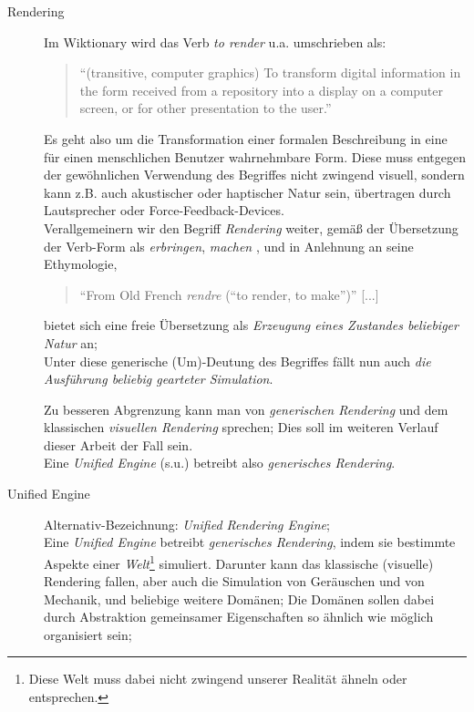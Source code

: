 \begin{description}

	\item[Rendering]
	Im Wiktionary \cite{internet:wiktionRender} wird das Verb \emph{to render} u.a. umschrieben als:
	\begin{quote}
		"`(transitive, computer graphics) To transform digital information in the form received from a repository into a 
		display on a computer screen, or for other presentation to the user."'
	\end{quote}	
	Es geht also um die Transformation einer formalen Beschreibung in eine für einen menschlichen Benutzer wahrnehmbare 
	Form. Diese muss entgegen der gewöhnlichen Verwendung des Begriffes nicht zwingend visuell, sondern kann z.B. auch 
	akustischer oder haptischer Natur sein, übertragen durch Lautsprecher oder Force-Feedback-Devices.\\
	
	Verallgemeinern wir den Begriff \emph{Rendering} weiter, gemäß der Übersetzung der Verb-Form als 
	\emph{erbringen}, \emph{machen} \cite{internet:dictCCrender},	
	und in Anlehnung an seine Ethymologie,
	\begin{quote}
		"`From Old French \emph{rendre} (“to render, to make”)"' [...] \cite{internet:wiktionRender}
	\end{quote}
	
	bietet sich eine freie Übersetzung als \emph{Erzeugung eines Zustandes beliebiger Natur} an;\\
	Unter diese generische (Um)-Deutung des Begriffes fällt nun auch \emph{die Ausführung beliebig gearteter Simulation}.
	
	Zu besseren Abgrenzung kann man von \emph{generischen Rendering} und dem klassischen 
	\emph{visuellen Rendering} sprechen; Dies soll im weiteren Verlauf dieser Arbeit der Fall sein.\\
	Eine \emph{Unified Engine} (s.u.) betreibt also \emph{generisches Rendering}.
	
	
	\item[Unified Engine] Alternativ-Bezeichnung: \emph{Unified Rendering Engine};\\
	Eine \emph{Unified Engine} betreibt \emph{generisches Rendering}, indem sie bestimmte Aspekte einer 
	\emph{Welt}\footnote{Diese Welt muss dabei nicht zwingend unserer Realität ähneln oder entsprechen.} simuliert. 
	Darunter kann das klassische (visuelle) Rendering fallen, aber auch die Simulation von Geräuschen und von Mechanik, und 
	beliebige weitere Domänen; Die Domänen sollen dabei durch Abstraktion gemeinsamer Eigenschaften so ähnlich wie möglich
	organisiert sein;
	

\end{description}
